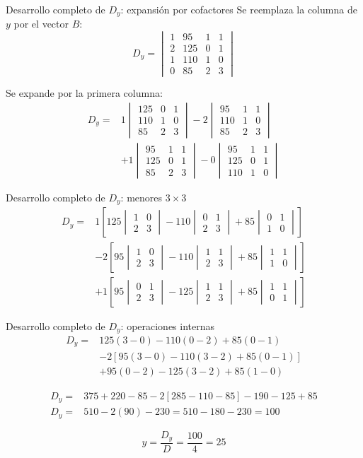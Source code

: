 \documentclass[aspectratio=169]{beamer}
\newcommand{\detm}[1]{\begin{vmatrix}#1\end{vmatrix}}
\begin{document}
\begin{frame}[shrink=10]{Desarrollo completo de $D_y$: expansión por cofactores}
Se reemplaza la columna de $y$ por el vector $B$:
\[
D_y=\detm{
1&95&1&1\\
2&125&0&1\\
1&110&1&0\\
0&85&2&3}
\]

Se expande por la primera columna:
\[
\begin{aligned}
D_y={}&1\detm{125&0&1\\110&1&0\\85&2&3}
-2\detm{95&1&1\\110&1&0\\85&2&3}\\
&+1\detm{95&1&1\\125&0&1\\85&2&3}
-0\detm{95&1&1\\125&0&1\\110&1&0}
\end{aligned}
\]
\end{frame}

\begin{frame}[shrink=17]{Desarrollo completo de $D_y$: menores $3\times3$}
\[
\begin{aligned}
D_y={}&1\left[125\detm{1&0\\2&3}-110\detm{0&1\\2&3}+85\detm{0&1\\1&0}\right]\\
&-2\left[95\detm{1&0\\2&3}-110\detm{1&1\\2&3}+85\detm{1&1\\1&0}\right]\\
&+1\left[95\detm{0&1\\2&3}-125\detm{1&1\\2&3}+85\detm{1&1\\0&1}\right]
\end{aligned}
\]
\end{frame}

\begin{frame}[shrink=13]{Desarrollo completo de $D_y$: operaciones internas}
\[
\begin{aligned}
D_y={}&125(3-0)-110(0-2)+85(0-1)\\
&-2[95(3-0)-110(3-2)+85(0-1)]\\
&+95(0-2)-125(3-2)+85(1-0)
\end{aligned}
\]

\[
\begin{aligned}
D_y={}&375+220-85-2[285-110-85]-190-125+85\\
D_y={}&510-2(90)-230=510-180-230=\boxed{100}
\end{aligned}
\]

\[
y=\frac{D_y}{D}=\frac{100}{4}=\boxed{25}
\]
\end{frame}
\end{document}
